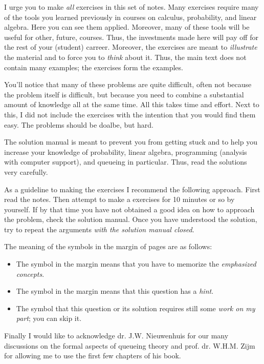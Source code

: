 I urge you to make \emph{all} exercises in this set of notes. Many
exercises require many of the tools you learned previously in courses
on calculus, probability, and linear algebra. Here you can see them
applied. Moreover, many of these tools will be useful for other,
future, courses. Thus, the investments made here will pay off for the
rest of your (student) carreer. Moreover, the exercises are meant to
\emph{illustrate} the material and to force you to \textit{think}
about it. Thus, the main text does not contain many examples; the
exercises form the examples.

You'll notice that many of these problems are quite difficult, often
not because the problem itself is difficult, but because you need to
combine a substantial amount of knowledge all at the same time.  All
this takes time and effort. Next to this, I did not include the
exercises with the intention that you would find them easy. The
problems should be doalbe, but hard.

The solution manual is meant to prevent you from getting stuck and to
help you increase your knowledge of probability, linear algebra,
programming (analysis with computer support), and queueing in
particular. Thus, read the solutions very carefully. 

As a guideline to making the exercises I recommend the following
approach.  First read the notes. Then attempt to make a exercises for
10 minutes or so by yourself. If by that time you have not obtained a
good idea on how to approach the problem, check the solution
manual. Once you have understood the solution, try to repeat the
arguments \emph{with the solution manual closed}.

The meaning of the symbols in the margin of pages are as follows:
\begin{itemize}
\item The symbol \recall{} in the margin means that you have to
  memorize the \emph{emphasized concepts}.
\item The symbol \hintsymbol in the margin means that this question
  has a \emph{hint}.
\item The symbol \tbd that this question or its solution requires
  still some \emph{work on my part}; you can skip it. 
\end{itemize}

Finally I would like to acknowledge dr. J.W. Nieuwenhuis for our many
discussions on the formal aspects of queueing theory and
prof. dr. W.H.M. Zijm for allowing me to use the first few chapters of
his book. 




